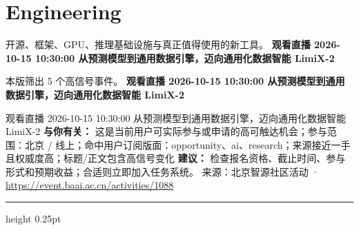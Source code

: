 \documentclass[10.5pt]{ctexart}
\begin{document}
\section*{Engineering}
{\color{ormuted} 开源、框架、GPU、推理基础设施与真正值得使用的新工具。}
\vspace{2mm}
{\LARGE\bfseries 观看直播 2026-10-15 10:30:00 从预测模型到通用数据引擎，迈向通用化数据智能 LimiX-2}\par
\vspace{1mm}
{\color{ormuted} 本版筛出 5 个高信号事件。}
\vspace{3mm}
{\Large\bfseries 观看直播 2026-10-15 10:30:00 从预测模型到通用数据引擎，迈向通用化数据智能 LimiX-2}\par
观看直播 2026-10-15 10:30:00 从预测模型到通用数据引擎，迈向通用化数据智能 LimiX-2
\textbf{与你有关：} 这是当前用户可实际参与或申请的高可触达机会；参与范围：北京 / 线上；命中用户订阅版面：opportunity、ai、research；来源接近一手且权威度高；标题/正文包含高信号变化
\textbf{建议：} 检查报名资格、截止时间、参与形式和预期收益；合适则立即加入任务系统。
{\footnotesize\color{ormuted} 来源：北京智源社区活动 · \url{https://event.baai.ac.cn/activities/1088}}
\vspace{4mm}
\hrule height 0.25pt
\vspace{3mm}
\end{document}
